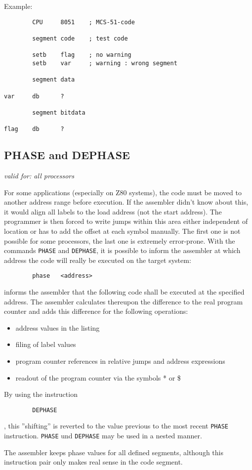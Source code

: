 \documentclass[12pt,twoside]{report}
\makeatletter
\newcommand{\tty}[1]{{\tt #1}}
\newcommand{\ttindex}[1]{\index{#1@{\tt #1}}}
\makeatother
\begin{document}
Example:
\begin{verbatim}
        CPU     8051    ; MCS-51-code

        segment code    ; test code

        setb    flag    ; no warning
        setb    var     ; warning : wrong segment

        segment data

var     db      ?

        segment bitdata

flag    db      ?
\end{verbatim}


\subsection{PHASE and DEPHASE}
\ttindex{PHASE}\ttindex{DEPHASE}

{\em valid for: all processors}

For some applications (especially on Z80 systems), the code must be moved
to another address range before execution.  If the assembler didn't know
about this, it would align all labels to the load address (not the start
address).  The programmer is then forced to write jumps within this area
either independent of location or has to add the offset at each symbol
manually.  The first one is not possible for some processors, the last one
is extremely error-prone.  With the commands \tty{PHASE} and
\tty{DEPHASE}, it is possible to inform the assembler at which address the
code will really be executed on the target system:
\begin{verbatim}
        phase   <address>
\end{verbatim}
informs the assembler that the following code shall be executed at the
specified address.  The assembler calculates thereupon the difference to
the real program counter and adds this difference for the following
operations:
\begin{itemize}
\item{address values in the listing}
\item{filing of label values}
\item{program counter references in relative jumps and address expressions}
\item{readout of the program counter via the symbols * or \$}
\end{itemize}
By using the instruction
\begin{verbatim}
        DEPHASE
\end{verbatim}
, this ''shifting'' is reverted to the value previous to the most
recent \tty{PHASE} instruction.  \tty{PHASE} und \tty{DEPHASE} may be used
in a nested manner.
\par
The assembler keeps phase values for all defined segments, although
this instruction pair only makes real sense in the code segment.
\end{document}
